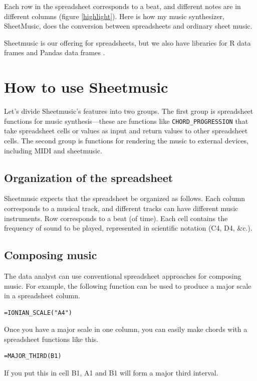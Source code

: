 \documentclass{acm_proc_article-sp}
\begin{document}
Each row in the spreadsheet corresponds to a beat,
and different notes are in different columns (figure \ref{highlight}).
Here is how my music synthesizer, SheetMusic, does the conversion
between spreadsheets and ordinary sheet music.

Sheetmusic is our offering for spreadsheets, but we
also have libraries for R data frames \cite{ddr} and Pandas
data frames \cite{ddpy}.

\section{How to use Sheetmusic}
Let's divide Sheetmusic's features into two groups. The first group
is spreadsheet functions for music synthesis---these are functions
like \texttt{CHORD\_PROGRESSION} that take spreadsheet cells or values
as input and return values to other spreadsheet cells. The second
group is functions for rendering the music to external devices,
including MIDI and sheetmusic.

\subsection{Organization of the spreadsheet}
Sheetmusic expects that the spreadsheet be organized as follows.
Each column corresponds
to a musical track, and different tracks can have different music instruments.
Row corresponds to a beat (of time).
Each cell contains the frequency of sound to be played, represented
in scientific notation (C4, D4, \&c.).

\subsection{Composing music}
The data analyst can use conventional spreadsheet approaches for
composing music. For example, the following function can be used
to produce a major scale in a spreadsheet column.

\begin{verbatim}
=IONIAN_SCALE("A4")
\end{verbatim}

Once you have a major scale in one column, you can easily make
chords with a spreadsheet functions like this.
\begin{verbatim}
=MAJOR_THIRD(B1)
\end{verbatim}
If you put this in cell B1, A1 and B1 will form a major third interval.
\end{document}
